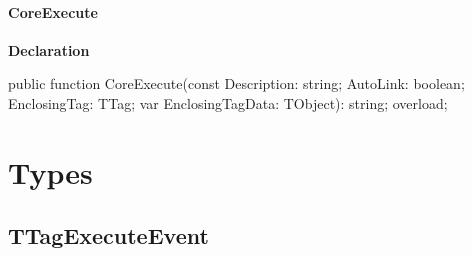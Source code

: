 \documentclass{report}
\newif\ifpdf
\begin{document}
\paragraph*{CoreExecute}\hspace*{\fill}

\label{PasDoc_TagManager.TTagManager-CoreExecute}
\begin{list}{}{
\setlength{\itemindent}{0cm}
\setlength{\listparindent}{0cm}
\setlength{\leftmargin}{\evensidemargin}
\addtolength{\leftmargin}{\tmplength}
\settowidth{\labelsep}{X}
\addtolength{\leftmargin}{\labelsep}
\setlength{\labelwidth}{\tmplength}
}
\item[\textbf{Declaration}\hfill]
\ifpdf
\begin{flushleft}
\fi
\begin{ttfamily}
public function CoreExecute(const Description: string; AutoLink: boolean; EnclosingTag: TTag; var EnclosingTagData: TObject): string; overload;\end{ttfamily}

\ifpdf
\end{flushleft}
\fi

\end{list}
\section{Types}
\ifpdf
\subsection*{\large{\textbf{TTagExecuteEvent}}\normalsize\hspace{1ex}\hrulefill}
\else
\end{document}
